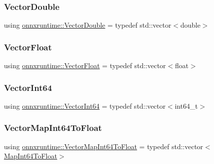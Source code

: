 \subsubsection{\texorpdfstring{Vector\+Double}{VectorDouble}}
{\footnotesize\ttfamily using \mbox{\hyperlink{namespaceonnxruntime_a99e5a794fb266de779627b0dd8136ea1}{onnxruntime\+::\+Vector\+Double}} = typedef std\+::vector$<$double$>$}

\mbox{\label{namespaceonnxruntime_a00d910cce3d8439516f44da75eb583e8}} 
\subsubsection{\texorpdfstring{Vector\+Float}{VectorFloat}}
{\footnotesize\ttfamily using \mbox{\hyperlink{namespaceonnxruntime_a00d910cce3d8439516f44da75eb583e8}{onnxruntime\+::\+Vector\+Float}} = typedef std\+::vector$<$float$>$}

\mbox{\label{namespaceonnxruntime_a1e83a297d78e79ab3df3afd3827ea78e}} 
\subsubsection{\texorpdfstring{Vector\+Int64}{VectorInt64}}
{\footnotesize\ttfamily using \mbox{\hyperlink{namespaceonnxruntime_a1e83a297d78e79ab3df3afd3827ea78e}{onnxruntime\+::\+Vector\+Int64}} = typedef std\+::vector$<$int64\+\_\+t$>$}

\mbox{\label{namespaceonnxruntime_ab31c3ad253dd12c1ed233e886fc5205b}} 
\subsubsection{\texorpdfstring{Vector\+Map\+Int64\+To\+Float}{VectorMapInt64ToFloat}}
{\footnotesize\ttfamily using \mbox{\hyperlink{namespaceonnxruntime_ab31c3ad253dd12c1ed233e886fc5205b}{onnxruntime\+::\+Vector\+Map\+Int64\+To\+Float}} = typedef std\+::vector$<$\mbox{\hyperlink{namespaceonnxruntime_ab3c488c9d67df3d8a91c90f9bb360e93}{Map\+Int64\+To\+Float}}$>$}

